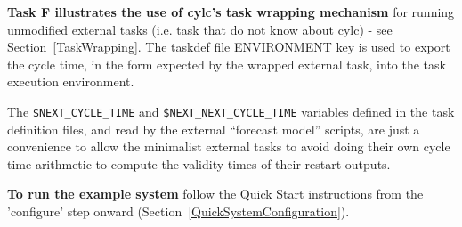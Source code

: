 {\bf Task F illustrates the use of cylc's task wrapping mechanism} for
running unmodified external tasks (i.e. task that do not know about
cylc) - see Section~\ref{TaskWrapping}. The taskdef file ENVIRONMENT key
is used to export the cycle time, in the form expected by the wrapped
external task, into the task execution environment.

The \lstinline=$NEXT_CYCLE_TIME= and \lstinline=$NEXT_NEXT_CYCLE_TIME=
variables defined in the task definition files, and read by the external
``forecast model'' scripts, are just a convenience to allow the minimalist
external tasks to avoid doing their own cycle time arithmetic to compute
the validity times of their restart outputs.

{\bf To run the example system} follow the Quick Start instructions from
the 'configure' step onward (Section~\ref{QuickSystemConfiguration}).
